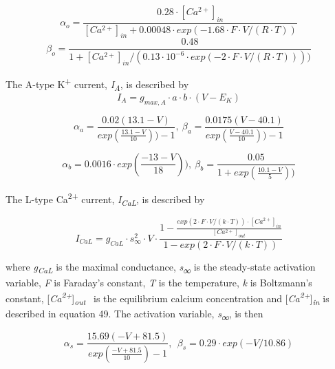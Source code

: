 \documentclass[12pt]{article}
\begin{document}
\begin{equation}
\alpha_{o} = \frac{0.28 \cdot[Ca^{2+}]_{in}}{[Ca^{2+}]_{in} + 0.00048	\cdot exp(-1.68 \cdot F \cdot V / (R \cdot T)) }
\end{equation}
\begin{equation}
\beta_{o} = \frac{0.48}{1 + [Ca^{2+}]_{in} / (0.13 \cdot 10^{-6} \cdot exp(-2 \cdot F \cdot V/ (R \cdot T))) )}
\end{equation}

The A-type K\textsuperscript{+} current,
\textit{I}\textit{\textsubscript{A}}, is described by\ \ 
\begin{equation}
I_A=g_{max, A} \cdot a \cdot b  \cdot (V-E_K)
\end{equation}

\begin{equation}
\alpha_a=\frac{0.02(13.1-V)}{exp(\frac{13.1-V}{10}))-1}, \ 
\beta_a=\frac{0.0175(V-40.1)}{exp(\frac{V-40.1}{10}))-1}
\end{equation}

\begin{equation}
\alpha_b = 0.0016 \cdot exp(\frac{-13-V}{18})), \  \beta_b=\frac{0.05}{1+exp(\frac{10.1-V}{5}))}
\end{equation}

The L-type Ca\textsuperscript{2+} current, \textit{I\textsubscript{CaL}}, is described by


\begin{equation}
I_{CaL}=g_{CaL}\cdot s_{\infty }^2\cdot V \cdot
\frac{1-\frac{exp(2 \cdot F \cdot V/ (k \cdot T)) \cdot [Ca^{2+}]_{in}}{[Ca^{2+}]_{out}}} {1-exp(2 \cdot F \cdot V/(k \cdot T))} 
\end{equation}


where \textit{g}\textit{\textsubscript{CaL}} is the maximal conductance, \textit{s}\textsf{\textit{\textsubscript{∞}}}
is the steady-state activation variable, \textit{F} is Faraday’s constant, \textit{T} is the temperature, \textit{k} is
Boltzmann’s constant, [\textit{Ca\textsuperscript{2+}}]\textit{\textsubscript{out}} \ is the equilibrium calcium concentration and [\textit{Ca\textsuperscript{2+}}]\textit{\textsubscript{in}} is
described in equation 49. The activation variable, \textit{s\textsubscript{∞}}, is then


\begin{equation}
\alpha_s=\frac{15.69(-V+81.5)}{exp(\frac{-V+81.5}{10})-1} , \ \  
\beta_s=0.29\cdot exp(-V/10.86)
\end{equation}
\end{document}
